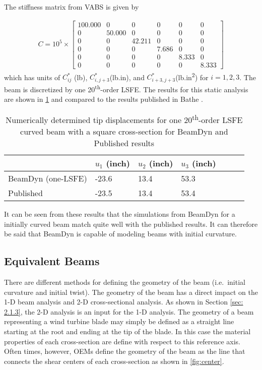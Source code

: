 \documentclass[letterpaper,12pt]{article}
\begin{document}
The stiffness matrix from VABS is given by 

\begin{align*}
C =10^5 \times \begin{bmatrix}
	100.000 & 0   & 0   & 0  & 0    & 0    \\
	0  & 50.000 & 0   & 0  & 0    & 0    \\
	0  & 0   & 42.211 & 0  & 0    & 0    \\
	0  & 0   & 0   & 7.686 & 0    & 0    \\
	0  & 0   & 0   & 0  & 8.333 & 0    \\
	0  & 0   & 0   & 0  & 0    & 8.333
\end{bmatrix}
\end{align*}
which has units of $C^*_{ij}$ (lb), $C^*_{i,j+3}$(lb.in), and $C^*_{i+3, j+3}$(lb.in\textsuperscript{2}) for $i=1, 2, 3$. The beam is discretized by one 20\textsuperscript{th}-order LSFE. The results for this static analysis are shown in \ref{tab:curve1} and compared to the results published in Bathe \cite{bathe1979large}.

\begin{table} [H]
\caption{\label{tab:curve1}Numerically determined tip displacements for one 20\textsuperscript{th}-order LSFE  curved beam with a square cross-section for BeamDyn and Published results } 
\begin{center}
    \begin{tabular}{| l | l | l | l | l | l | l |}
    	\hline
    	        & $u_1$ (inch) & $u_2$ (inch) & $u_3$ (inch)  \\ \hline
    	BeamDyn (one-LSFE) & -23.6     & 13.4       & 53.3      \\  \hline
    	Published   & -23.5     & 13.4       & 53.4     \\ \hline
    \end{tabular}
\end{center}
\end{table} 

It can be seen from these results that the simulations from BeamDyn for a initially curved beam match quite well with the published results. It can therefore be said that BeamDyn is capable of modeling beams with initial curvature.

\subsection{Equivalent Beams}
There are different methods for defining the geometry of the beam (i.e.\ initial curvature and initial twist). The geometry of the beam has a direct impact on the 1-D beam analysis and 2-D cross-sectional analysis. As shown in Section \ref{sec: 2.1.3}, the 2-D analysis is an input for the 1-D analysis. The geometry of a beam representing a wind turbine blade may simply be defined as a straight line starting at the root and ending at the tip of the blade. In this case the material properties of each cross-section are define with respect to this reference axis. Often times, however, OEMs define the geometry of the beam as the line that connects the shear centers of each cross-section as shown in \ref{fig:center}.
\end{document}
